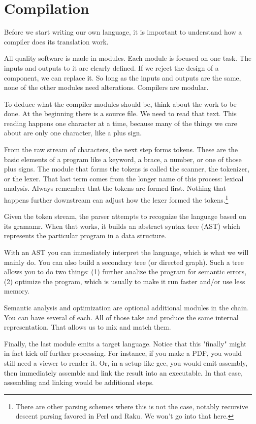 \chapter{Compilation}

Before we start writing our own language, it is important to understand
how a compiler does its translation work.

All quality software is made in modules. Each module is focused on one
task. The inputs and outputs to it are clearly defined. If we reject
the design of a component, we can replace it. So long as the inputs and
outputs are the same, none of the other modules need alterations. Compilers
are modular.

To deduce what the compiler modules should be, think about the work to
be done. At the beginning there is a source file. We need to read that
text. This reading happens one character at a time, because many
of the things we care about are only one character, like a plus sign.

From the raw stream of characters, the next step forms tokens. These
are the basic elements of a program like a keyword, a brace, a number, or
one of those plus signs. The module that forms the tokens is called
the scanner, the tokenizer, or the lexer. That last term comes from
the longer name of this process: lexical analysis. Always remember
that the tokens are formed first. Nothing that happens further downstream
can adjust how the lexer formed the tokens.\footnote{There are other
parsing schemes where this is not the case, notably recursive descent
parsing favored in Perl and Raku. We won't go into that here.}

Given the token stream, the parser attempts to recognize the language
based on its gramamr. When that works, it builds an abstract syntax
tree (AST) which represents the particular program in a data structure.

With an AST you can immediately interpret the language, which is what we
will mainly do. You can also build a secondary tree (or directed graph).
Such a tree allows you to do two things: (1) further analize the program
for semantic errors, (2) optimize the program, which is usually to make
it run faster and/or use less memory.

Semantic analysis and optimization are optional additional modules in the
chain. You can have several of each. All of those take and produce
the same internal representation. That allows us to mix and match them.

Finally, the last module emits a target language. Notice that this
"finally" might in fact kick off further processing. For instance, if you
make a PDF, you would still need a viewer to render it. Or, in a setup
like gcc, you would emit assembly, then immediately assemble and link
the result into an executable. In that case, assembling and linking would
be additional steps.

